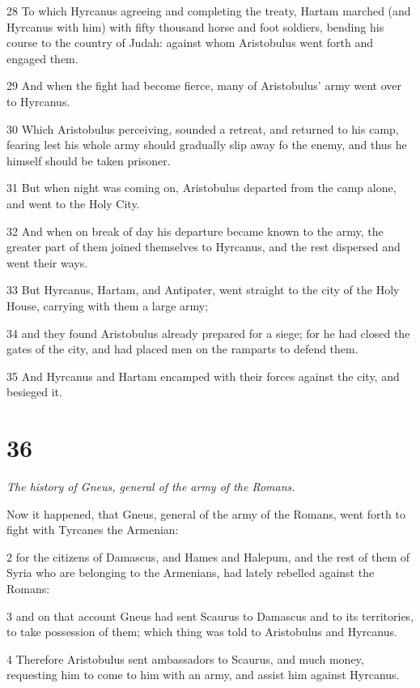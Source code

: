 28 To which Hyrcanus agreeing and completing the treaty, Hartam marched (and Hyrcanus with him) with fifty thousand horse and foot soldiers, bending his course to the country of Judah: against whom Aristobulus went forth and engaged them. 

29 And when the fight had become fierce, many of Aristobulus’ army went over to Hyrcanus. 

30 Which Aristobulus perceiving, sounded a retreat, and returned to his camp, fearing lest his whole army should gradually slip away fo the enemy, and thus he himself should be taken prisoner. 

31 But when night was coming on, Aristobulus departed from the camp alone, and went to the Holy City. 

32 And when on break of day his departure became known to the army, the greater part of them joined themselves to Hyrcanus, and the rest dispersed and went their ways. 

33 But Hyrcanus, Hartam, and Antipater, went straight to the city of the Holy House, carrying with them a large army; 

34 and they found Aristobulus already prepared for a siege; for he had closed the gates of the city, and had placed men on the ramparts to defend them. 

35 And Hyrcanus and Hartam encamped with their forces against the city, and besieged it. 


\chapter{36}

\par \textit{The history of Gneus, general of the army of the Romans.}

Now it happened, that Gneus, general of the army of the Romans, went forth to fight with Tyrcanes the Armenian: 

2 for the citizens of Damascus, and Hames and Halepum, and the rest of them of Syria who are belonging to the Armenians, had lately rebelled against the Romans: 

3 and on that account Gneus had sent Scaurus to Damascus and to its territories, to take possession of them; which thing was told to Aristobulus and Hyrcanus. 

4 Therefore Aristobulus sent ambassadors to Scaurus, and much money, requesting him to come to him with an army, and assist him against Hyrcanus. 

